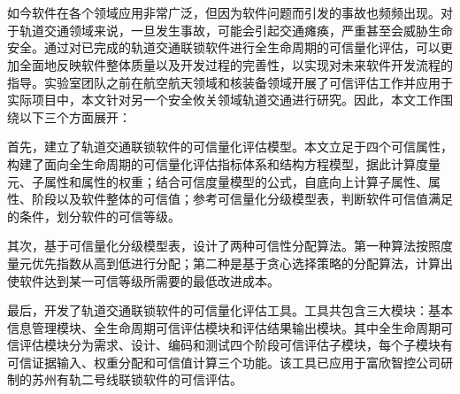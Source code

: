 \vspace{-2.5cm}
\chapter*{}
\vspace{-1cm}

\setlength{\baselineskip}{25pt}
如今软件在各个领域应用非常广泛，但因为软件问题而引发的事故也频频出现。对于轨道交通领域来说，一旦发生事故，可能会引起交通瘫痪，严重甚至会威胁生命安全。通过对已完成的轨道交通联锁软件进行全生命周期的可信量化评估，可以更加全面地反映软件整体质量以及开发过程的完善性，以实现对未来软件开发流程的指导。实验室团队之前在航空航天领域和核装备领域开展了可信评估工作并应用于实际项目中，本文针对另一个安全攸关领域轨道交通进行研究。因此，本文工作围绕以下三个方面展开：

首先，建立了轨道交通联锁软件的可信量化评估模型。本文立足于四个可信属性，构建了面向全生命周期的可信量化评估指标体系和结构方程模型，据此计算度量元、子属性和属性的权重；结合可信度量模型的公式，自底向上计算子属性、属性、阶段以及软件整体的可信值；参考可信量化分级模型表，判断软件可信值满足的条件，划分软件的可信等级。

其次，基于可信量化分级模型表，设计了两种可信性分配算法。第一种算法按照度量元优先指数从高到低进行分配；第二种是基于贪心选择策略的分配算法，计算出使软件达到某一可信等级所需要的最低改进成本。

最后，开发了轨道交通联锁软件的可信量化评估工具。工具共包含三大模块：基本信息管理模块、全生命周期可信评估模块和评估结果输出模块。其中全生命周期可信评估模块分为需求、设计、编码和测试四个阶段可信评估子模块，每个子模块有可信证据输入、权重分配和可信值计算三个功能。该工具已应用于富欣智控公司研制的苏州有轨二号线联锁软件的可信评估。




